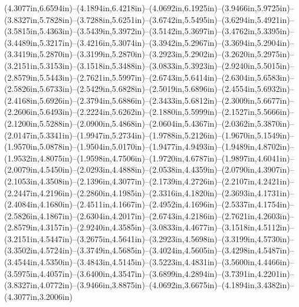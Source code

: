 (4.3077in,6.6594in)--(4.1894in,6.4218in)--(4.0692in,6.1925in)--(3.9466in,5.9725in)--(3.8327in,5.7828in)--(3.7288in,5.6251in)--(3.6742in,5.5495in)--(3.6294in,5.4921in)--(3.5815in,5.4363in)--(3.5439in,5.3972in)--(3.5142in,5.3697in)--(3.4762in,5.3395in)--(3.4489in,5.3217in)--(3.4216in,5.3074in)--(3.3942in,5.2967in)--(3.3694in,5.2904in)--(3.3419in,5.2870in)--(3.3199in,5.2870in)--(3.2923in,5.2902in)--(3.2620in,5.2975in)--(3.2151in,5.3153in)--(3.1518in,5.3488in)--(3.0833in,5.3923in)--(2.9240in,5.5015in)--(2.8579in,5.5443in)--(2.7621in,5.5997in)--(2.6743in,5.6414in)--(2.6304in,5.6583in)--(2.5826in,5.6733in)--(2.5429in,5.6828in)--(2.5019in,5.6896in)--(2.4554in,5.6932in)--(2.4168in,5.6926in)--(2.3794in,5.6886in)--(2.3433in,5.6812in)--(2.3009in,5.6677in)--(2.2606in,5.6493in)--(2.2224in,5.6262in)--(2.1880in,5.5999in)--(2.1527in,5.5666in)--(2.1200in,5.5288in)--(2.0900in,5.4868in)--(2.0604in,5.4367in)--(2.0362in,5.3870in)--(2.0147in,5.3341in)--(1.9947in,5.2734in)--(1.9788in,5.2126in)--(1.9670in,5.1549in)--(1.9570in,5.0878in)--(1.9504in,5.0170in)--(1.9477in,4.9493in)--(1.9489in,4.8702in)--(1.9532in,4.8075in)--(1.9598in,4.7506in)--(1.9720in,4.6787in)--(1.9897in,4.6041in)--(2.0079in,4.5450in)--(2.0293in,4.4888in)--(2.0538in,4.4359in)--(2.0790in,4.3907in)--(2.1053in,4.3508in)--(2.1396in,4.3077in)--(2.1739in,4.2726in)--(2.2107in,4.2421in)--(2.2447in,4.2196in)--(2.2860in,4.1985in)--(2.3316in,4.1820in)--(2.3693in,4.1731in)--(2.4084in,4.1680in)--(2.4511in,4.1667in)--(2.4952in,4.1696in)--(2.5337in,4.1754in)--(2.5826in,4.1867in)--(2.6304in,4.2017in)--(2.6743in,4.2186in)--(2.7621in,4.2603in)--(2.8579in,4.3157in)--(2.9240in,4.3585in)--(3.0833in,4.4677in)--(3.1518in,4.5112in)--(3.2151in,4.5447in)--(3.2675in,4.5641in)--(3.2923in,4.5698in)--(3.3199in,4.5730in)--(3.3502in,4.5724in)--(3.3749in,4.5685in)--(3.4024in,4.5605in)--(3.4298in,4.5487in)--(3.4544in,4.5350in)--(3.4843in,4.5145in)--(3.5223in,4.4831in)--(3.5600in,4.4466in)--(3.5975in,4.4057in)--(3.6400in,4.3547in)--(3.6899in,4.2894in)--(3.7391in,4.2201in)--(3.8327in,4.0772in)--(3.9466in,3.8875in)--(4.0692in,3.6675in)--(4.1894in,3.4382in)--(4.3077in,3.2006in) 